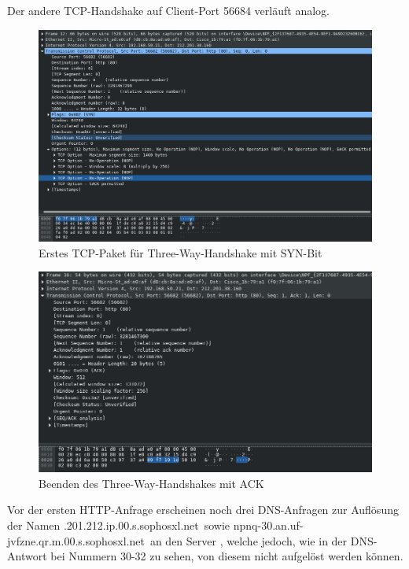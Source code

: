 \documentclass[11pt, a4paper]{article}
\begin{document}
Der andere TCP-Handshake auf Client-Port 56684 verläuft analog.\\

\begin{figure}[H]
  \centering
  \includegraphics[width=\textwidth]{graphics/versuch/3_4/wireshark/tcp_syn}
  \caption{Erstes TCP-Paket für Three-Way-Handshake mit SYN-Bit}\label{tcp_syn}
\end{figure}

\begin{figure}[H]
  \centering
  \includegraphics[width=\textwidth]{graphics/versuch/3_4/wireshark/tcp_ack}
  \caption{Beenden des Three-Way-Handshakes mit ACK}\label{tcp_ack}
\end{figure}

Vor der ersten HTTP-Anfrage erscheinen noch drei DNS-Anfragen zur Auflösung der Namen .201.212.ip.00.s.sophosxl.net\grqq\ sowie \glqq npnq-30.an.uf-jvfzne.qr.m.00.s.sophosxl.net\grqq\ an den Server , welche jedoch, wie in der DNS-Antwort bei Nummern 30-32 zu sehen, von diesem nicht aufgelöst werden können.\\
\end{document}
